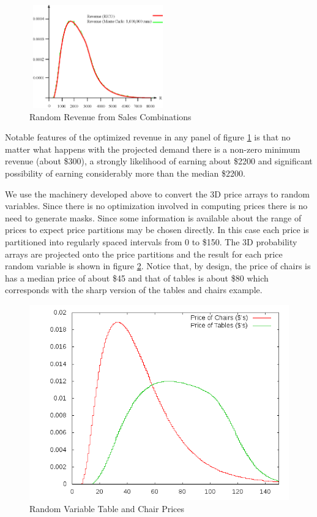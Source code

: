 \begin{figure}[ht]
\begin{minipage}[b]{0.5\linewidth}
\centering
\includegraphics[width=2.33in, height=1.75in]{Images/ABC_1M}
\end{minipage}
  \caption[Random Revenue from Sales Combinations]
          {Random Revenue from Sales Combinations}
  \label{fig:ABC_4}
\end{figure}



Notable features of the optimized revenue in any panel of figure \ref{fig:ABC_4} is that no matter what happens with the projected demand there is a non-zero minimum revenue (about \$300), a strongly likelihood of earning about \$2200 and significant possibility of earning considerably more than the median \$2200.

We use the machinery developed above to convert the 3D price arrays to random variables. Since there is no optimization involved in computing prices there is no need to generate masks. Since some information is available about the range of prices to expect price partitions may be chosen directly. In this case each price is partitioned into regularly spaced intervals from 0 to \$150. The 3D probability arrays are projected onto the price partitions and the result for each price random variable is shown in figure \ref{fig:tcd_prices}. Notice that, by design, the price of chairs is has a median price of about \$45 and that of tables is about \$80 which corresponds with the sharp version of the tables and chairs example. 

\begin{figure}
  \centering
  \includegraphics[width=120mm]{Images/tcd_prices}
  \caption[Random Variable Table and Chair Prices]
          {Random Variable Table and Chair Prices}
  \label{fig:tcd_prices}
\end{figure}

